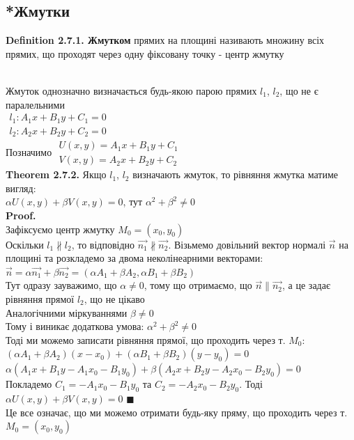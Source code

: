 \documentclass[a4paper, 14pt]{extarticle}
\def\defin#1{\textbf{Definition {#1}}}
\def\th#1{\textbf{Theorem {#1}}}
\def\proof{\textbf{Proof.}\\}
\def\bigline{\vspace{5mm}\\}
\def\qed{$\blacksquare$}
\begin{document}
\subsection{*Жмутки}
\defin{2.7.1. Жмутком} прямих на площині називають множину всіх прямих, що проходят через одну фіксовану точку - центр жмутку\\
\\
Жмуток однозначно визначається будь-якою парою прямих $l_1$, $l_2$, що не є паралельними\\
$\begin{gathered}
l_1: A_1x+B_1y+C_1 = 0\\
l_2: A_2x + B_2y+C_2 = 0
\end{gathered}
$\\
Позначимо $\begin{gathered}
U(x,y) = A_1x+B_1y+C_1\\
V(x,y) = A_2x + B_2y+C_2
\end{gathered}$\\
\th{2.7.2.} Якщо $l_1$, $l_2$ визначають жмуток, то рівняння жмутка матиме вигляд:\\
$\alpha U(x,y) + \beta V(x,y) = 0$, тут $\alpha^2 + \beta^2 \neq 0$\\
\proof
Зафіксуємо центр жмутку $M_0 = (x_0,y_0)$\\
Оскільки $l_1 \not\parallel l_2$, то відповідно $\vec{n_1} \not\parallel \vec{n_2}$. Візьмемо довільний вектор нормалі $\vec{n}$ на площині та розкладемо за двома неколінеарними векторами:\\
$\vec{n} = \alpha \vec{n_1} + \beta \vec{n_2} = (\alpha A_1 + \beta A_2, \alpha B_1+\beta B_2)$\\
Тут одразу зауважимо, що $\alpha \neq 0$, тому що отримаємо, що $\vec{n} \parallel \vec{n_2}$, а це задає рівняння прямої $l_2$, що не цікаво\\
Аналогічними міркуваннями $\beta \neq 0$\\
Тому і виникає додаткова умова: $\alpha^2 + \beta^2 \neq 0$\\
Тоді ми можемо записати рівняння прямої, що проходить через т. $M_0$:\\
$(\alpha A_1 + \beta A_2)(x-x_0) + (\alpha B_1 + \beta B_2)(y-y_0) = 0$\\
$\alpha(A_1x+B_1y-A_1x_0-B_1y_0) + \beta(A_2x+B_2y-A_2x_0-B_2y_0) = 0$\\
Покладемо $C_1 = -A_1x_0 -B_1y_0$ та $C_2 = -A_2x_0-B_2y_0$. Тоді\\
$\alpha U(x,y) + \beta V(x,y) = 0$ \qed
\bigline
Це все означає, що ми можемо отримати будь-яку пряму, що проходить через т. $M_0 =(x_0,y_0)$
\newpage
\end{document}
